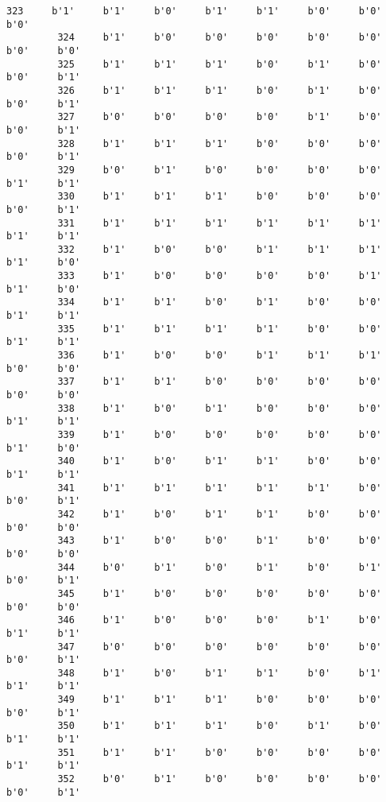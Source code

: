 \documentclass[11pt]{article}
\begin{document}
\begin{Verbatim}[commandchars=\\\{\}]
         323     b'1'     b'1'     b'0'     b'1'     b'1'     b'0'     b'0'     b'0'   
         324     b'1'     b'0'     b'0'     b'0'     b'0'     b'0'     b'0'     b'0'   
         325     b'1'     b'1'     b'1'     b'0'     b'1'     b'0'     b'0'     b'1'   
         326     b'1'     b'1'     b'1'     b'0'     b'1'     b'0'     b'0'     b'1'   
         327     b'0'     b'0'     b'0'     b'0'     b'1'     b'0'     b'0'     b'1'   
         328     b'1'     b'1'     b'1'     b'0'     b'0'     b'0'     b'0'     b'1'   
         329     b'0'     b'1'     b'0'     b'0'     b'0'     b'0'     b'1'     b'1'   
         330     b'1'     b'1'     b'1'     b'0'     b'0'     b'0'     b'0'     b'1'   
         331     b'1'     b'1'     b'1'     b'1'     b'1'     b'1'     b'1'     b'1'   
         332     b'1'     b'0'     b'0'     b'1'     b'1'     b'1'     b'1'     b'0'   
         333     b'1'     b'0'     b'0'     b'0'     b'0'     b'1'     b'1'     b'0'   
         334     b'1'     b'1'     b'0'     b'1'     b'0'     b'0'     b'1'     b'1'   
         335     b'1'     b'1'     b'1'     b'1'     b'0'     b'0'     b'1'     b'1'   
         336     b'1'     b'0'     b'0'     b'1'     b'1'     b'1'     b'0'     b'0'   
         337     b'1'     b'1'     b'0'     b'0'     b'0'     b'0'     b'0'     b'0'   
         338     b'1'     b'0'     b'1'     b'0'     b'0'     b'0'     b'1'     b'1'   
         339     b'1'     b'0'     b'0'     b'0'     b'0'     b'0'     b'1'     b'0'   
         340     b'1'     b'0'     b'1'     b'1'     b'0'     b'0'     b'1'     b'1'   
         341     b'1'     b'1'     b'1'     b'1'     b'1'     b'0'     b'0'     b'1'   
         342     b'1'     b'0'     b'1'     b'1'     b'0'     b'0'     b'0'     b'0'   
         343     b'1'     b'0'     b'0'     b'1'     b'0'     b'0'     b'0'     b'0'   
         344     b'0'     b'1'     b'0'     b'1'     b'0'     b'1'     b'0'     b'1'   
         345     b'1'     b'0'     b'0'     b'0'     b'0'     b'0'     b'0'     b'0'   
         346     b'1'     b'0'     b'0'     b'0'     b'1'     b'0'     b'1'     b'1'   
         347     b'0'     b'0'     b'0'     b'0'     b'0'     b'0'     b'0'     b'1'   
         348     b'1'     b'0'     b'1'     b'1'     b'0'     b'1'     b'1'     b'1'   
         349     b'1'     b'1'     b'1'     b'0'     b'0'     b'0'     b'0'     b'1'   
         350     b'1'     b'1'     b'1'     b'0'     b'1'     b'0'     b'1'     b'1'   
         351     b'1'     b'1'     b'0'     b'0'     b'0'     b'0'     b'1'     b'1'   
         352     b'0'     b'1'     b'0'     b'0'     b'0'     b'0'     b'0'     b'1'   

\end{Verbatim}
\end{document}
